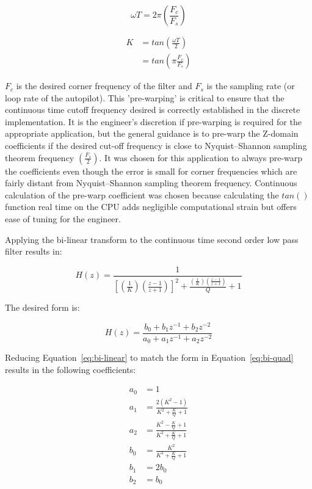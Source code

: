 \begin{equation}
 \omega T = 2\pi\left(\frac{F_c}{F_s}\right)
\end{equation}

\begin{equation}
\begin{split}
 K &= tan\left(\frac{\omega T}{2}\right) \\
 &= tan\left(\pi\frac{F_c}{F_s}\right)
\end{split}
\end{equation}



$F_c$ is the desired corner frequency of the filter and $F_s$ is the sampling rate (or loop rate of the autopilot).
This 'pre-warping' is critical to ensure that the continuous time cutoff frequency desired is correctly established in the discrete implementation.  It is the engineer's discretion if pre-warping is required for the appropriate application, but the general guidance is to pre-warp the Z-domain coefficients if the desired cut-off frequency is close to Nyquist–Shannon sampling theorem frequency $(\frac{F_s}{2})$.  It was chosen for this application to always pre-warp the coefficients even though the error is small for corner frequencies which are fairly distant from Nyquist–Shannon sampling theorem frequency.  Continuous calculation of the pre-warp coefficient was chosen because calculating the $tan()$ function real time on the CPU adds negligible computational strain but offers ease of tuning for the engineer.

Applying the bi-linear transform to the continuous time second order low pass filter results in:

\begin{equation}\label{eq:bi-linear}
 H(z) = \frac{1}{ \left[\left(\frac{1}{K}\right)\left(\frac{z-1}{z+1}\right)\right]^2+\frac{ \left(\frac{1}{K}\right)\left(\frac{z-1}{z+1}\right)}{Q}+1}
\end{equation}

The desired form is:

\begin{equation}\label{eq:bi-quad}
 H(z) = \frac{b_0 + b_1 z^{-1} + b_2 z^{-2}}{a_0 + a_1 z^{-1} + a_2 z^{-2}}
\end{equation}

Reducing Equation~\ref{eq:bi-linear} to match the form in Equation~\ref{eq:bi-quad} results in the following coefficients:

\begin{equation}
\begin{split}
 a_0 &= 1 \\
 a_1 &= \frac{2(K^2-1)}{K^2+\frac{K}{Q}+1} \\
 a_2 &= \frac{K^2-\frac{K}{Q}+1}{K^2+\frac{K}{Q}+1} \\
 b_0 &= \frac{K^2}{K^2+\frac{K}{Q}+1} \\
 b_1 &= 2b_0 \\
 b_2 &= b_0  
\end{split}
\end{equation}


